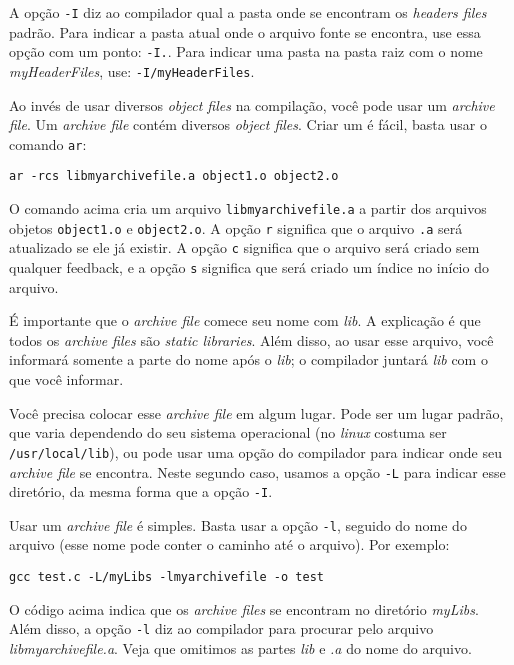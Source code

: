 \documentclass[12pt, a4paper]{article}
\begin{document}
A opção \verb|-I| diz ao compilador qual a pasta onde se encontram os \textit{headers files} padrão. Para indicar a pasta atual onde o arquivo fonte se encontra, use essa opção com um ponto: \verb|-I.|. Para indicar uma pasta na pasta raiz com o nome \textit{myHeaderFiles}, use: \verb|-I/myHeaderFiles|.

Ao invés de usar diversos \textit{object files} na compilação, você pode usar um \textit{archive file}. Um \textit{archive file} contém diversos \textit{object files}. Criar um é fácil, basta usar o comando \verb|ar|:

\begin{verbatim}
ar -rcs libmyarchivefile.a object1.o object2.o
\end{verbatim}

O comando acima cria um arquivo \verb|libmyarchivefile.a| a partir dos arquivos objetos \verb|object1.o| e \verb|object2.o|. A opção \verb|r| significa que o arquivo \verb|.a| será atualizado se ele já existir. A opção \verb|c| significa que o arquivo será criado sem qualquer feedback, e a opção \verb|s| significa que será criado um índice no início do arquivo.

É importante que o \textit{archive file} comece seu nome com \textit{lib}. A explicação é que todos os \textit{archive files} são \textit{static libraries}. Além disso, ao usar esse arquivo, você informará somente a parte do nome após o \textit{lib}; o compilador juntará \textit{lib} com o que você informar.

Você precisa colocar esse \textit{archive file} em algum lugar. Pode ser um lugar padrão, que varia dependendo do seu sistema operacional (no \textit{linux} costuma ser \verb|/usr/local/lib|), ou pode usar uma opção do compilador para indicar onde seu \textit{archive file} se encontra. Neste segundo caso, usamos a opção \verb|-L| para indicar esse diretório, da mesma forma que a opção \verb|-I|.

Usar um \textit{archive file} é simples. Basta usar a opção \verb|-l|, seguido do nome do arquivo (esse nome pode conter o caminho até o arquivo). Por exemplo:

\begin{verbatim}
gcc test.c -L/myLibs -lmyarchivefile -o test
\end{verbatim}

O código acima indica que os \textit{archive files} se encontram no diretório \textit{myLibs}. Além disso, a opção \verb|-l| diz ao compilador para procurar pelo arquivo \textit{libmyarchivefile.a}. Veja que omitimos as partes \textit{lib} e \textit{.a} do nome do arquivo.
\end{document}
